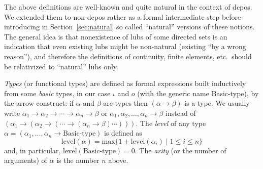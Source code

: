 \documentclass[fleqn]{LMCS}
\theoremstyle{plain}\newtheorem{satz}[thm]{Satz}
\theoremstyle{plain}\newtheorem{hyp}[thm]{Hypothesis}
\theoremstyle{plain}\newtheorem{hyps}[thm]{Hypotheses}
\theoremstyle{definition}\newtheorem{note}[thm]{Note}
\newcommand{\arr}{\rightarrow}
\newcommand{\?}{\mbox{?}}
\begin{document}
The above definitions are well-known and quite natural in the context of dcpos. 
We extended them to non-dcpos rather 
as a formal intermediate step 
before introducing in Section~\ref{sec:natural} so called ``natural'' versions 
of these notions. The general idea is that nonexistence of lubs of some 
directed sets is an indication that even existing lubs might be non-natural 
(existing ``by a wrong reason''), and 
therefore the definitions of continuity, finite elements, etc.\ should 
be relativized to ``natural'' lubs only. 


{\em Types} (or functional types) are defined as formal expressions
built inductively from some {\em basic\/} types, in our case $\iota$
and $o$ 
(with the generic name \mbox{Basic-type}), 
by the arrow construct: if $\alpha$ and $\beta$ are types
then $(\alpha\arr\beta)$ is a type. We usually write
$\alpha_1\arr\alpha_2\arr\cdots\arr\alpha_n\arr\beta$ or 
$\alpha_1,\alpha_2,\ldots,\alpha_n\arr\beta$ instead of
$(\alpha_1\arr(\alpha_2\arr(\cdots\arr(\alpha_n\arr\beta)\cdots)))$.
The \emph{level} of any type
$\alpha = (\alpha_1,\ldots,\alpha_n \arr \mbox{Basic-type})$
is defined as
\[
\mbox{level}(\alpha) = \mbox{max}\{1+\mbox{level}(\alpha_i)\mid 1\le i\le n\}
\]
and, in particular, 
$
\mbox{level}(\mbox{Basic-type}) = 0.
$
The \emph{arity} (or the number of arguments) 
of $\alpha$ is the number $n$ above. 
\end{document}
